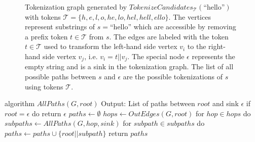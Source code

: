 \begin{figure}[htbp]
	\centering
	\caption{
Tokenization graph generated by $TokenizeCandidates_{\mathcal{T}}(\textrm{``hello''})$ with tokens $\mathcal{T} = \{ h, e, l, o, he, lo,  hel, hell, ello \}$.
The vertices represent substrings of $s = $``hello'' which are accessible by removing a prefix token $t \in \mathcal{T}$ from $s$.
The edges are labeled with the token $t \in \mathcal{T}$ used to transform the left-hand side vertex $v_i$ to the right-hand side vertex $v_j$, i.e. $v_i = t || v_j$.
The special node $\epsilon$ represents the empty string and is a sink in the tokenization graph.
The list of all possible paths between $s$ and $\epsilon$ are the possible tokenizations of $s$ using tokens $\mathcal{T}$.
}
	\label{fig:ex-graph-tokenize-candidates}
\end{figure}

\begin{Pseudocode}[float,caption={
DFS-based algorithm which generates a list of all possible paths between between a root and a sink $\epsilon$ in a DAG.
This algorithm's performance can be sped up by using dynamic programming to cache results of invocations of AllPaths.
},label={alg:all-paths}]
algorithm $AllPaths(G, root)	$
	Output: List of paths between $root$ and sink $\epsilon$
	if $root = \epsilon$ do
		return $\epsilon$
	$paths \leftarrow \emptyset$
	$hops \leftarrow OutEdges(G, root)$
	for $hop \in hops$ do
		$subpaths \leftarrow AllPaths(G, hop, sink)$
		for $subpath \in subpaths$ do
			$paths \leftarrow paths \cup \{ root || subpath \}$
	return $paths$
\end{Pseudocode}

